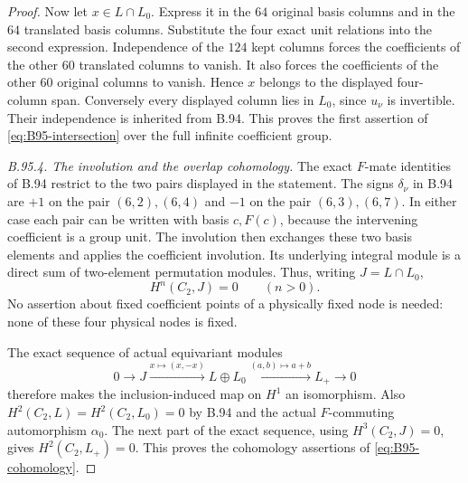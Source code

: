 \begin{proof}
Now let $x\in L\cap L_0$. Express it in the $64$ original basis
columns and in the $64$ translated basis columns. Substitute the
four exact unit relations into the second expression. Independence
of the $124$ kept columns forces the coefficients of the other $60$
translated columns to vanish. It also forces the coefficients of
the other $60$ original columns to vanish. Hence $x$ belongs to the
displayed four-column span. Conversely every displayed column lies
in $L_0$, since $u_\nu$ is invertible. Their independence is inherited
from B.94. This proves the first assertion of
\eqref{eq:B95-intersection} over the full infinite coefficient group.

\emph{B.95.4. The involution and the overlap cohomology.}
The exact $F$-mate identities of B.94 restrict to the two pairs
displayed in the statement. The signs $\delta_\nu$ in B.94 are $+1$
on the pair $(6,2),(6,4)$ and $-1$ on the pair $(6,3),(6,7)$.
In either case each pair can be written with basis $c,F(c)$,
because the intervening coefficient is a group unit. The involution
then exchanges these two basis elements and applies the coefficient
involution. Its underlying integral module is a direct sum of
two-element permutation modules. Thus, writing $J=L\cap L_0$,
\[
                            H^n(C_2,J)=0\qquad(n>0).
\]
No assertion about fixed coefficient points of a physically fixed
node is needed: none of these four physical nodes is fixed.

The exact sequence of actual equivariant modules
\begin{equation}\label{eq:B95-overlap-sequence}
 0\longrightarrow J\xrightarrow{x\mapsto(x,-x)}L\oplus L_0
        \xrightarrow{(a,b)\mapsto a+b}L_+\longrightarrow0
\end{equation}
therefore makes the inclusion-induced map on $H^1$ an isomorphism.
Also $H^2(C_2,L)=H^2(C_2,L_0)=0$ by B.94 and the actual
$F$-commuting automorphism $\alpha_0$. The next part of the exact
sequence, using $H^3(C_2,J)=0$, gives $H^2(C_2,L_+)=0$.
This proves the cohomology assertions of \eqref{eq:B95-cohomology}.


\end{proof}
